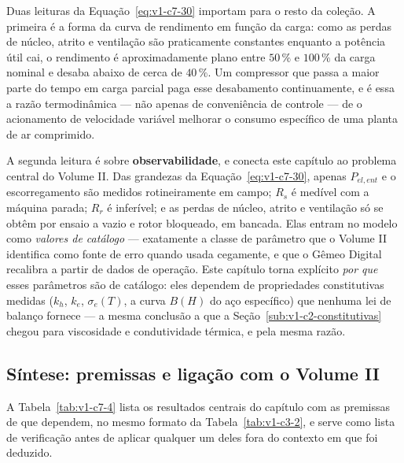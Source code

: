 \documentclass[12pt,a4paper]{article}
\numberwithin{equation}{section}
\numberwithin{table}{section}
\numberwithin{figure}{section}
\begin{document}
Duas leituras da Equação~\eqref{eq:v1-c7-30} importam para o resto da coleção.
A primeira é a forma da curva de rendimento em função da carga: como as perdas
de núcleo, atrito e ventilação são praticamente constantes enquanto a potência
útil cai, o rendimento é aproximadamente plano entre $50\,\%$ e $100\,\%$ da
carga nominal e desaba abaixo de cerca de $40\,\%$. Um compressor que passa a
maior parte do tempo em carga parcial paga esse desabamento continuamente, e é
essa a razão termodinâmica --- não apenas de conveniência de controle --- de o
acionamento de velocidade variável melhorar o consumo específico de uma
planta de ar comprimido.

A segunda leitura é sobre \textbf{observabilidade}, e conecta este capítulo ao
problema central do Volume II. Das grandezas da
Equação~\eqref{eq:v1-c7-30}, apenas $P_{el,ent}$ e o escorregamento são
medidos rotineiramente em campo; $R_s$ é medível com a máquina parada; $R_r$ é
inferível; e as perdas de núcleo, atrito e ventilação só se obtêm por ensaio a
vazio e rotor bloqueado, em bancada. Elas entram no modelo como \emph{valores
de catálogo} --- exatamente a classe de parâmetro que o Volume II identifica
como fonte de erro quando usada cegamente, e que o Gêmeo Digital recalibra a
partir de dados de operação. Este capítulo torna explícito \emph{por que} esses
parâmetros são de catálogo: eles dependem de propriedades constitutivas
medidas ($k_h$, $k_e$, $\sigma_e(T)$, a curva $B(H)$ do aço específico) que
nenhuma lei de balanço fornece --- a mesma conclusão a que a
Seção~\ref{sub:v1-c2-constitutivas} chegou para viscosidade e condutividade
térmica, e pela mesma razão.

\subsection{Síntese: premissas e ligação com o Volume
II}\label{sub:v1-c7-sintese}

A Tabela~\ref{tab:v1-c7-4} lista os resultados centrais do capítulo com as
premissas de que dependem, no mesmo formato da Tabela~\ref{tab:v1-c3-2}, e
serve como lista de verificação antes de aplicar qualquer um deles fora do
contexto em que foi deduzido.
\end{document}
